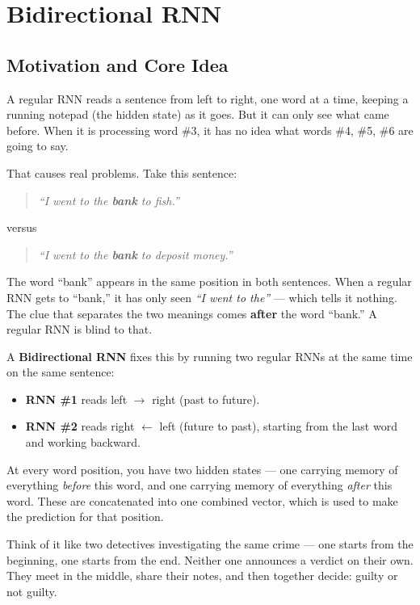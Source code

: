 \section{Bidirectional RNN}

\subsection{Motivation and Core Idea}

A regular RNN reads a sentence from left to right, one word at a time, keeping a running notepad (the hidden state) as it goes. But it can only see what came before. When it is processing word \#3, it has no idea what words \#4, \#5, \#6 are going to say.

That causes real problems. Take this sentence:

\begin{quote}
\textit{``I went to the \textbf{bank} to fish.''}
\end{quote}

versus

\begin{quote}
\textit{``I went to the \textbf{bank} to deposit money.''}
\end{quote}

The word ``bank'' appears in the same position in both sentences. When a regular RNN gets to ``bank,'' it has only seen \textit{``I went to the''} --- which tells it nothing. The clue that separates the two meanings comes \textbf{after} the word ``bank.'' A regular RNN is blind to that.

A \textbf{Bidirectional RNN} fixes this by running two regular RNNs at the same time on the same sentence:

\begin{itemize}
    \item \textbf{RNN \#1} reads left $\rightarrow$ right (past to future).
    \item \textbf{RNN \#2} reads right $\leftarrow$ left (future to past), starting from the last word and working backward.
\end{itemize}

At every word position, you have two hidden states --- one carrying memory of everything \textit{before} this word, and one carrying memory of everything \textit{after} this word. These are concatenated into one combined vector, which is used to make the prediction for that position.

Think of it like two detectives investigating the same crime --- one starts from the beginning, one starts from the end. Neither one announces a verdict on their own. They meet in the middle, share their notes, and then together decide: guilty or not guilty.

